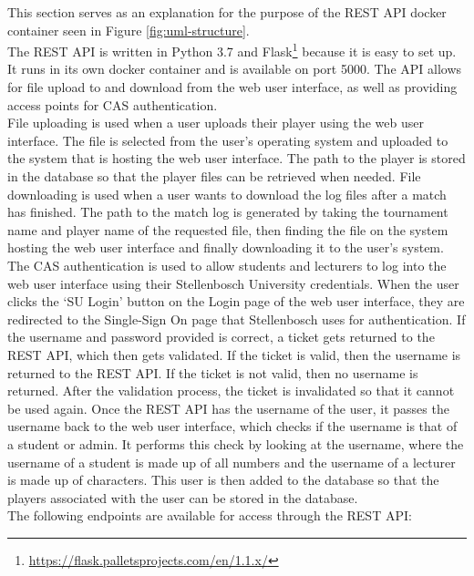 \documentclass[a4paper, 11pt]{report}
\begin{document}
This section serves as an explanation for the purpose of the REST API docker
container seen in Figure \ref{fig:uml-structure}. \\

The REST API is written in Python 3.7 and Flask\footnote{\url{https://flask.palletsprojects.com/en/1.1.x/}}
because it is easy to set up. It runs in its own docker container and is
available on port 5000. The API allows for file upload to and download from the
web user interface, as well as providing access points for CAS authentication. \\

File uploading is used when a user uploads their player using the web user
interface. The file is selected from the user's operating system and uploaded
to the system that is hosting the web user interface. The path to the player
is stored in the database so that the player files can be retrieved when needed.
File downloading is used when a user wants to download the log files after
a match has finished. The path to the match log is generated by taking the
tournament name and player name of the requested file, then finding the file on
the system hosting the web user interface and finally downloading it to the user's
system. \\

The CAS authentication is used to allow students and lecturers to log into the
web user interface using their Stellenbosch University credentials. When the
user clicks the `SU Login' button on the Login page of the web user interface,
they are redirected to the Single-Sign On page that Stellenbosch uses for
authentication. If the username and password provided is correct, a ticket gets
returned to the REST API, which then gets validated. If the ticket is valid, then
the username is returned to the REST API. If the ticket is not valid, then no
username is returned. After the validation process, the ticket is invalidated so
that it cannot be used again. Once the REST API has the username of the user,
it passes the username back to the web user interface, which checks if the username
is that of a student or admin. It performs this check by looking at the username,
where the username of a student is made up of all numbers and the username of
a lecturer is made up of characters. This user is then added to the database so
that the players associated with the user can be stored in the database. \\

The following endpoints are available for access through the REST API:
\end{document}
